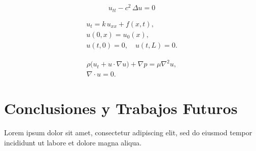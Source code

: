 \documentclass[12pt]{extarticle}
\numberwithin{equation}{section}
\begin{document}
\begin{equation}\label{eq:onda}
u_{tt} - c^2\,\Delta u = 0
\end{equation}

\begin{gather} %
  u_t = k\,u_{xx} + f(x,t), \label{eq:heat_b1} \\
  u(0,x) = u_0(x), \nonumber\\
  u(t,0) = 0,\quad u(t,L)=0. \label{eq:heat_b2}
\end{gather}

\begin{subequations}\label{eq:navier_stokes} %
\begin{gather} 
  \rho\bigl(u_t + u\cdot\nabla u\bigr) + \nabla p = \mu\nabla^2 u, \\
  \nabla\cdot u = 0.
\end{gather}
\end{subequations}


\section{Conclusiones y Trabajos Futuros}
Lorem ipsum dolor sit amet, consectetur adipiscing elit, sed do eiusmod tempor incididunt ut labore et dolore magna aliqua.
\end{document}
